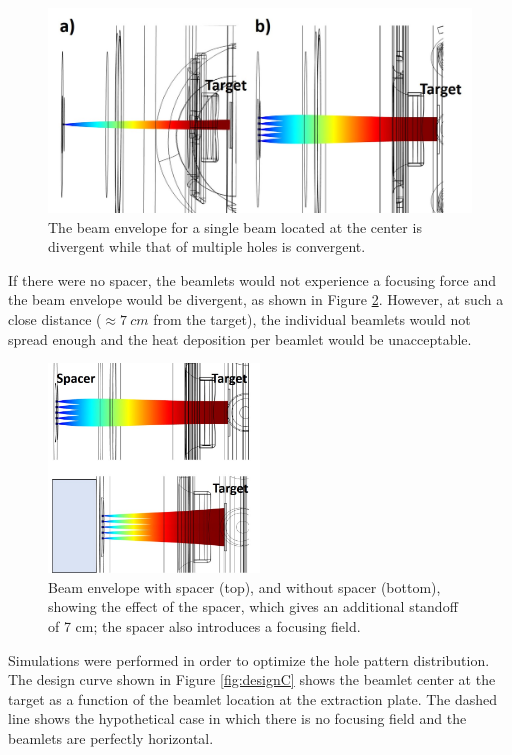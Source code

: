 \documentclass[review]{elsarticle}
\begin{document}
\begin{figure}
	\centering
	\includegraphics[height=0.5\textwidth]{pics/single_vs_mult2}
	\caption{The beam envelope for a single beam located at the center is divergent while that of multiple holes is convergent.}
	\label{fig:single_vs_mult}
\end{figure}

If there were no spacer, the beamlets would not experience a focusing force and the beam envelope would be divergent, as shown in Figure \ref{fig:spacer_vs_noSpacer}. However, at such a close distance ($\approx 7\ cm$ from the target), the individual beamlets would not spread enough and the heat deposition per beamlet would be unacceptable.  

\begin{figure}
	\centering
	\includegraphics[width=0.5\textwidth]{pics/spacer_vs_noSpacer2}
	\caption{Beam envelope with spacer (top), and without spacer (bottom), showing the effect of the spacer, which gives an additional standoff of 7 cm; the spacer also introduces a focusing field.}
	\label{fig:spacer_vs_noSpacer}
\end{figure}
 
Simulations were performed in order to optimize the hole pattern distribution. The design curve shown in Figure \ref{fig:designC} shows the beamlet center at the target as a function of the beamlet location at the extraction plate. The dashed line shows the hypothetical case in which there is no focusing field and the beamlets are perfectly horizontal. 
\end{document}
